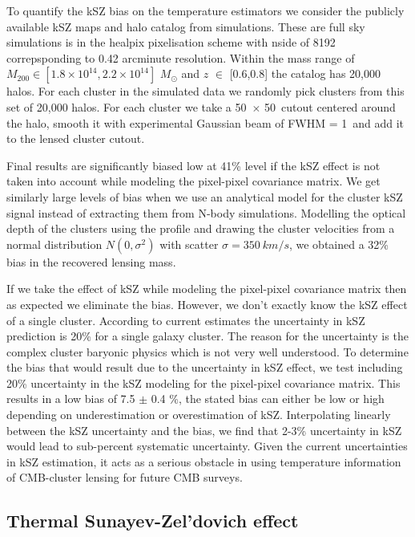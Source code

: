 To quantify the kSZ bias on the temperature estimators we consider the publicly available kSZ maps and halo catalog from \citet{flender16} simulations.
These are full sky simulations is in the healpix \citep{gorski05} pixelisation scheme with nside of 8192 correpsponding to 0.42 arcminute resolution.
Within the mass range of $M_{200} \in [1.8 \times 10^{14},2.2 \times 10^{14}]$ $M_{\odot}$ and $z$ $\in$ [0.6,0.8] the catalog has 20,000 halos. 
For each cluster in the simulated data we randomly pick clusters from this set of 20,000 halos. For each cluster we take a 50\am\ $\times$ 50\am\ cutout centered around the halo, smooth it with experimental Gaussian beam of FWHM = 1\am\ and add it to the lensed cluster cutout. 

Final results are significantly biased low at 41\% level if the kSZ effect is not taken into account while modeling the pixel-pixel covariance matrix. We get similarly large levels of bias when we use an analytical model for the cluster kSZ signal instead of extracting them from N-body simulations. Modelling the optical depth of the clusters using the \citet{battaglia16b} profile and drawing the cluster velocities from a normal distribution $N(0, \sigma^{2})$ with scatter $\sigma = 350\ km/s$, we obtained a 32\% bias in the recovered lensing mass.
  
 If we take the effect of kSZ while modeling the pixel-pixel covariance matrix then as expected we eliminate the bias. 
 However, we don't exactly know the kSZ effect of a single cluster. According to current estimates the uncertainty in kSZ prediction is 20\% for a single galaxy cluster. 
 The reason for the uncertainty is the complex cluster baryonic physics which is not very well understood. 
 To determine the bias that would result due to the uncertainty in kSZ effect, we test including 20\% uncertainty in the kSZ modeling for the pixel-pixel covariance matrix. 
 This results in a low bias of 7.5 $\pm $ 0.4 \%, the stated bias can either be low or high depending on underestimation or overestimation of kSZ.
 Interpolating linearly between the kSZ uncertainty and the bias, we find that 2-3\% uncertainty in kSZ would lead to sub-percent systematic uncertainty. 
 Given the current uncertainties in kSZ estimation, it acts as a serious obstacle in using temperature information of CMB-cluster lensing for future CMB surveys. 
 
 \subsection{Thermal Sunayev-Zel'dovich effect}
 

